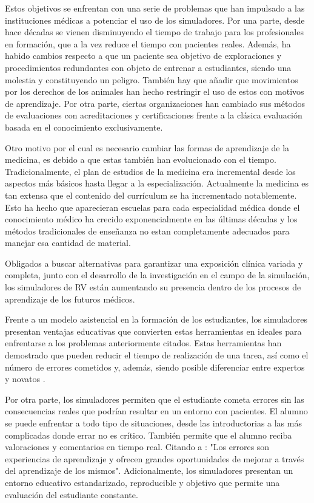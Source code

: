 Estos objetivos se enfrentan con una serie de problemas que han impulsado a las instituciones médicas a potenciar el uso de los simuladores.
Por una parte,  desde hace décadas se vienen disminuyendo el tiempo de trabajo para los profesionales en formación, que a la vez reduce el tiempo con pacientes reales. Además,  ha habido cambios respecto a que un paciente sea objetivo de exploraciones y procedimientos redundantes con objeto de entrenar a estudiantes, siendo una molestia y constituyendo un peligro. También hay que añadir que movimientos por los derechos de los animales han hecho restringir el uso de estos con motivos de aprendizaje. Por otra parte, ciertas organizaciones han cambiado sus métodos de evaluaciones con acreditaciones y certificaciones frente a la clásica evaluación basada en el conocimiento exclusivamente.

Otro motivo por el cual es necesario cambiar las formas de aprendizaje de la medicina, es debido a que estas también han evolucionado con el tiempo.
Tradicionalmente, el plan de estudios de la medicina era incremental desde los aspectos más básicos hasta llegar a la especialización. Actualmente la medicina es tan extensa que el contenido del currículum se ha incrementado notablemente. Esto ha hecho que aparecieran escuelas para cada especialidad médica donde el conocimiento médico ha crecido exponencialmente en las últimas décadas y los métodos tradicionales de enseñanza no estan completamente adecuados para manejar esa cantidad de material.

Obligados a buscar alternativas para garantizar una exposición clínica variada y completa, junto con el desarrollo de la investigación en el campo de la simulación, los simuladores de \ac{RV} están aumentando su presencia dentro de los procesos de aprendizaje de los futuros médicos.

Frente a un modelo asistencial en la formación de los estudiantes, los simuladores presentan  ventajas educativas que convierten estas herramientas en ideales para enfrentarse a los problemas anteriormente citados. Estas herramientas han demostrado que pueden reducir el tiempo de realización de una tarea, así como el número de errores cometidos y, además, siendo posible diferenciar entre expertos y novatos \cite{Gurusamy08}.

Por otra parte, los simuladores permiten que el estudiante cometa errores sin las consecuencias reales que podrían resultar en un entorno con pacientes. El alumno se puede enfrentar a todo tipo de situaciones, desde las introductorias a las más complicadas donde errar no es crítico. También permite que el alumno reciba valoraciones y comentarios en tiempo real. Citando a \cite{ziv2008educacion}: "Los errores son experiencias de aprendizaje y ofrecen grandes oportunidades de mejorar a través del aprendizaje de los mismos". Adicionalmente, los simuladores presentan un entorno educativo estandarizado, reproducible y objetivo que permite una evaluación del estudiante constante.



